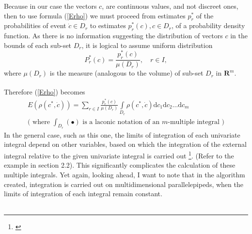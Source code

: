 Because in our case the vectors $c$, are continuous values, and not discreet ones, then to use formula (\ref{Erho}) we must proceed from estimates $p_{r}^{*}$ of the probabilities of event $\dot{c} \in D_{r}$ to estimates $p_{r}^{*}(c), c \in D_{r}$, of a probability density function. As there is no information suggesting the distribution of vectors $c$ in the bounds of each sub-set $D_{r}$, it is logical to assume uniform distribution
\begin{equation}
P_{r}^{*}(c)=\frac{p_{r}^{*}(c)}{\mu(D_{r})}, \quad r \in I,
\end{equation}
where $\mu(D_{r})$ is the measure (analogous to the volume) of sub-set $D_{r}$ in $\boldsymbol{R}^{m}$. \\
\\
Therefore (\ref{Erho}) becomes
\begin{gather}
E(\rho(c^{*},\dot{c}))=\sum\limits_{r \in I} \frac{p_{r}^{*}(c)}{\mu(D_{r})} \int\limits_{D_{r}}\rho(c^{*},\dot{c})\mathrm{d}c_{1}\mathrm{d}c_{2}\dots \mathrm{d}c_{m} \label{mathexpectancy}\\
\nonumber
\text{( where $\int_ {D_{r}}(\bullet)$ is a laconic notation of an $m$-multiple integral )}
\end{gather}
In the general case, such as this one, the limits of integration of each univariate integral depend on other variables, based on which the integration of the external integral relative to the given univariate integral is carried out \footnote{\cite{stewart_2008_int}}. (Refer to the example in section 2.2). This significantly complicates the calculation of these multiple integrals. Yet again, looking ahead, I want to note that in the algorithm created, integration is carried out on multidimensional parallelepipeds, when the limits of integration of each integral remain constant. \\
\\
